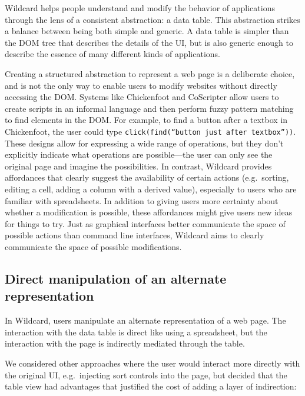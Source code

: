 \documentclass[english,submission]{programming}
\begin{document}
Wildcard helps people understand and modify the behavior of applications
through the lens of a consistent abstraction: a data table. This
abstraction strikes a balance between being both simple and generic. A
data table is simpler than the DOM tree that describes the details of
the UI, but is also generic enough to describe the essence of many
different kinds of applications.

Creating a structured abstraction to represent a web page is a
deliberate choice, and is not the only way to enable users to modify
websites without directly accessing the DOM. Systems like Chickenfoot
\autocite{bolin2005} and CoScripter \autocite{leshed2008} allow users to
create scripts in an informal language and then perform fuzzy pattern
matching to find elements in the DOM. For example, to find a button
after a textbox in Chickenfoot, the user could type
\texttt{click(find(“button\ just\ after\ textbox”))}. These designs
allow for expressing a wide range of operations, but they don't
explicitly indicate what operations are possible---the user can only see
the original page and imagine the possibilities. In contrast, Wildcard
provides affordances that clearly suggest the availability of certain
actions (e.g.~sorting, editing a cell, adding a column with a derived
value), especially to users who are familiar with spreadsheets. In
addition to giving users more certainty about whether a modification is
possible, these affordances might give users new ideas for things to
try. Just as graphical interfaces better communicate the space of
possible actions than command line interfaces, Wildcard aims to clearly
communicate the space of possible modifications.

\hypertarget{direct-manipulation-of-an-alternate-representation}{%
\subsection{Direct manipulation of an alternate
representation}\label{direct-manipulation-of-an-alternate-representation}}

In Wildcard, users manipulate an alternate representation of a web page.
The interaction with the data table is direct like using a spreadsheet,
but the interaction with the page is indirectly mediated through the
table.

We considered other approaches where the user would interact more
directly with the original UI, e.g.~injecting sort controls into the
page, but decided that the table view had advantages that justified the
cost of adding a layer of indirection:
\end{document}
